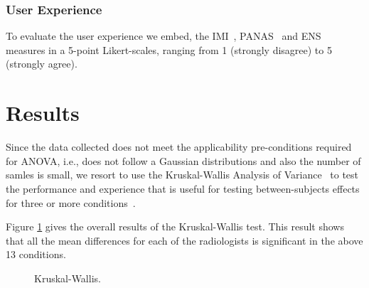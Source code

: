 \documentclass{chi-ext}
\begin{document}
\subsubsection{User Experience}

To evaluate the user experience we embed, the IMI~\cite{ryan1982control}, PANAS~\cite{watson1999panas}
and ENS~\cite{broeck2010capturing} measures in a 5-point Likert-scales,  ranging from 1 (strongly disagree) to 5 (strongly agree).

\section{Results}

Since the data collected does not meet the applicability pre-conditions required for ANOVA, i.e., does not follow a Gaussian distributions and also the number of samles is small, we resort to use the Kruskal-Wallis Analysis of Variance~\cite{theodorsson1986kruskal} to test the performance and experience that is useful for testing between-subjects effects for three or more conditions~\cite{mcfarlane2002comparison}.

Figure \ref{fig:Fig8}  gives the overall results of the Kruskal-Wallis test. This result shows that all the mean differences for each of the radiologists is significant in the above 13 conditions.

\begin{figure}
\caption{Kruskal-Wallis.}
\label{fig:Fig8}
\end{figure}
\end{document}
